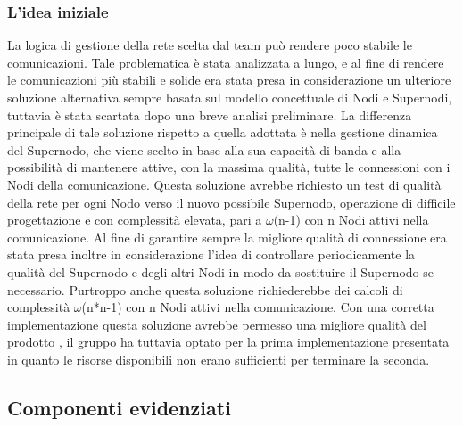 \subsubsection{L'idea iniziale}
La logica di gestione della rete scelta dal team può rendere poco stabile le comunicazioni. Tale problematica è stata analizzata a lungo, e al fine di rendere le comunicazioni più stabili e solide era stata presa in considerazione un ulteriore soluzione alternativa sempre basata sul modello concettuale di Nodi e Supernodi, tuttavia è stata scartata dopo una breve analisi preliminare.
La differenza principale di tale soluzione rispetto a quella adottata è nella gestione dinamica del Supernodo, che viene scelto in base alla sua capacità di banda e alla possibilità di mantenere attive, con la massima qualità, tutte le connessioni con i Nodi della comunicazione.
Questa soluzione avrebbe richiesto un test di qualità della rete per ogni Nodo verso il nuovo possibile Supernodo, operazione di difficile progettazione e con complessità elevata, pari a $\omega$(n-1) con n Nodi attivi nella comunicazione.
Al fine di garantire sempre la migliore qualità di connessione era stata presa inoltre in considerazione l'idea di controllare periodicamente la qualità del Supernodo e degli altri Nodi in modo da sostituire il Supernodo se necessario. Purtroppo anche questa soluzione richiederebbe dei calcoli di complessità $\omega$(n*n-1) con n Nodi attivi nella comunicazione.
Con una corretta implementazione questa soluzione avrebbe permesso una migliore qualità del prodotto \caName, il gruppo ha tuttavia optato per la prima implementazione presentata in quanto le risorse disponibili non erano sufficienti per terminare la seconda.

\subsection{Componenti evidenziati}

